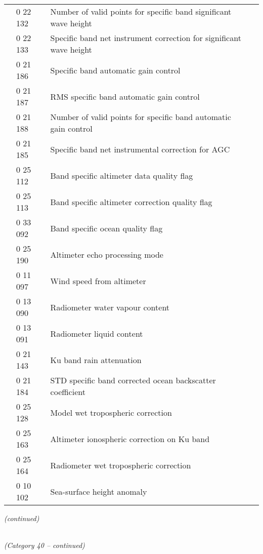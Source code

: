 \begin{longtable}[]{@{}llll@{}}
& 0 22 132 & Number of valid points for specific band significant wave height &\tabularnewline
& 0 22 133 & Specific band net instrument correction for significant wave height &\tabularnewline
& 0 21 186 & Specific band automatic gain control &\tabularnewline
& 0 21 187 & RMS specific band automatic gain control &\tabularnewline
& 0 21 188 & Number of valid points for specific band automatic gain control &\tabularnewline
& 0 21 185 & Specific band net instrumental correction for AGC &\tabularnewline
& 0 25 112 & Band specific altimeter data quality flag &\tabularnewline
& 0 25 113 & Band specific altimeter correction quality flag &\tabularnewline
& 0 33 092 & Band specific ocean quality flag &\tabularnewline
& 0 25 190 & Altimeter echo processing mode &\tabularnewline
& 0 11 097 & Wind speed from altimeter &\tabularnewline
& 0 13 090 & Radiometer water vapour content &\tabularnewline
& 0 13 091 & Radiometer liquid content &\tabularnewline
& 0 21 143 & Ku band rain attenuation &\tabularnewline
& 0 21 184 & STD specific band corrected ocean backscatter coefficient &\tabularnewline
& 0 25 128 & Model wet tropospheric correction &\tabularnewline
& 0 25 163 & Altimeter ionospheric correction on Ku band &\tabularnewline
& 0 25 164 & Radiometer wet tropospheric correction &\tabularnewline
& 0 10 102 & Sea-surface height anomaly &\tabularnewline
\bottomrule
\end{longtable}

\emph{(continued)}

\emph{\\
(Category 40 -- continued)}


